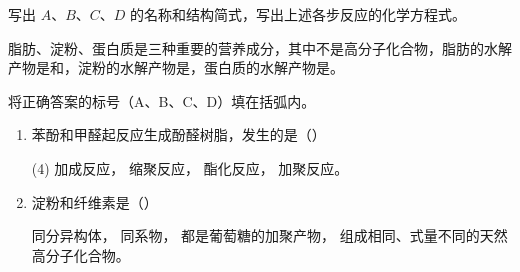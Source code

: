 \begin{Exercise}
\begin{question}
  写出 $A$、$B$、$C$、$D$ 的名称和结构简式，写出上述各步反应的化学方程式。
  \item 脂肪、淀粉、蛋白质是三种重要的营养成分，其中不是高分子化合物，脂肪的水解产物是和，淀粉的水解产物是，蛋白质的水解产物是。
  \item 将正确答案的标号（A、B、C、D）填在括弧内。
  \begin{enumerate}[(1),itemindent=2.4em]
    \item 苯酚和甲醛起反应生成酚醛树脂，发生的是\hfill（\qquad ）
    \begin{tasks}[label=\Alph*](4)
      \task 加成反应，
      \task 缩聚反应，
      \task 酯化反应，
      \task 加聚反应。
    \end{tasks}
    \item 淀粉和纤维素是\hfill（\qquad ）
    \begin{tasks}[label=\Alph*]
      \task 同分异构体，
      \task 同系物，
      \task 都是葡萄糖的加聚产物，
      \task 组成相同、式量不同的天然高分子化合物。
    \end{tasks}
  \end{enumerate}
\end{question}
\end{Exercise}
